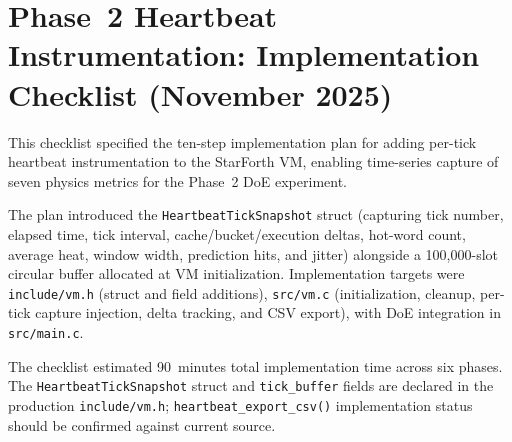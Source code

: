 
\section*{Phase~2 Heartbeat Instrumentation: Implementation Checklist (November 2025)}

This checklist specified the ten-step implementation plan for adding per-tick
heartbeat instrumentation to the StarForth VM, enabling time-series capture
of seven physics metrics for the Phase~2 DoE experiment.

The plan introduced the \texttt{HeartbeatTickSnapshot} struct (capturing tick
number, elapsed time, tick interval, cache/bucket/execution deltas, hot-word
count, average heat, window width, prediction hits, and jitter) alongside a
100,000-slot circular buffer allocated at VM initialization. Implementation
targets were \texttt{include/vm.h} (struct and field additions), \texttt{src/vm.c}
(initialization, cleanup, per-tick capture injection, delta tracking, and CSV
export), with DoE integration in \texttt{src/main.c}.

The checklist estimated 90~minutes total implementation time across six phases.
The \texttt{HeartbeatTickSnapshot} struct and \texttt{tick\_buffer} fields are
declared in the production \texttt{include/vm.h}; \texttt{heartbeat\_export\_csv()}
implementation status should be confirmed against current source.

